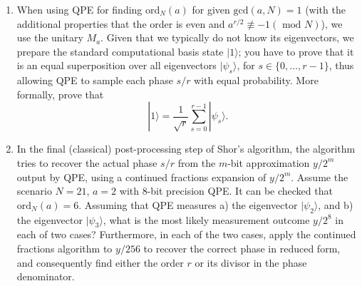 \documentclass[12pt]{article}
\begin{document}
\begin{enumerate}
\item When using QPE for finding $\text{ord}_N(a)$ for given $\text{gcd}(a,N)=1$ (with the additional properties that the order is even and $a^{r/2}\not\equiv -1 (\text{ mod } N)$), we use the unitary $M_a$. Given that we typically do not know its eigenvectors, we prepare the standard computational basis state $|1\rangle$; you have to prove that it is an equal superposition over all eigenvectors $|\psi_s\rangle$, for $s\in \{0,\ldots,r-1\}$, thus allowing QPE to sample each phase $s/r$ with equal probability. More formally, prove that
$$|1\rangle=\dfrac{1}{\sqrt{r}}\displaystyle\sum_{s=0}^{r-1} |\psi_s\rangle.$$
\item In the final (classical) post-processing step of Shor's algorithm, the algorithm tries to recover the actual phase $s/r$ from the $m$-bit approximation $y/2^m$ output by QPE, using a continued fractions expansion of $y/2^m$. Assume the scenario $N=21$, $a=2$ with $8$-bit precision QPE. It can be checked that $\text{ord}_N(a)=6.$ Assuming that QPE measures a) the eigenvector $|\psi_2\rangle$, and b) the eigenvector $|\psi_3\rangle$, what is the most likely measurement outcome $y/2^8$ in each of two cases? Furthermore, in each of the two cases, apply the continued fractions algorithm to $y/256$ to recover the correct phase in reduced form, and consequently find either the order $r$ or its divisor in the phase denominator. 
\end{enumerate} 
\end{document}
